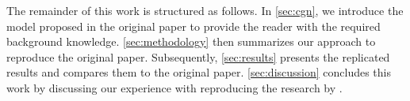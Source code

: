 The remainder of this work is structured as follows. In \cref{sec:cgn}, we introduce the model proposed in the original paper to provide the reader with the required background knowledge. \cref{sec:methodology} then summarizes our approach to reproduce the original paper. Subsequently, \cref{sec:results} presents the replicated results and compares them to the original paper. \cref{sec:discussion} concludes this work by discussing our experience with reproducing the research by \citet{Sauer2021ICLR}.



